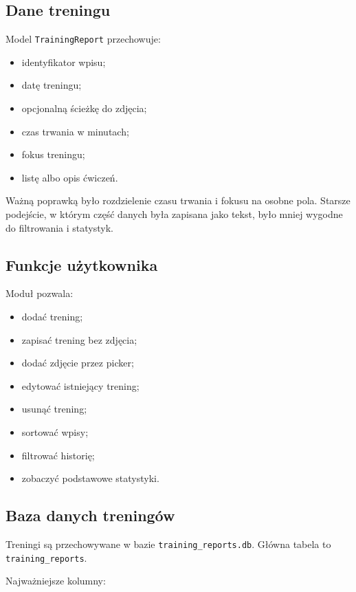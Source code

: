 \documentclass[12pt,a4paper]{article}
\begin{document}
\subsection{Dane treningu}

Model \texttt{TrainingReport} przechowuje:

\begin{itemize}
    \item identyfikator wpisu;
    \item datę treningu;
    \item opcjonalną ścieżkę do zdjęcia;
    \item czas trwania w minutach;
    \item fokus treningu;
    \item listę albo opis ćwiczeń.
\end{itemize}

Ważną poprawką było rozdzielenie czasu trwania i fokusu na osobne pola. Starsze podejście, w którym część danych była zapisana jako tekst, było mniej wygodne do filtrowania i statystyk.

\subsection{Funkcje użytkownika}

Moduł pozwala:

\begin{itemize}
    \item dodać trening;
    \item zapisać trening bez zdjęcia;
    \item dodać zdjęcie przez picker;
    \item edytować istniejący trening;
    \item usunąć trening;
    \item sortować wpisy;
    \item filtrować historię;
    \item zobaczyć podstawowe statystyki.
\end{itemize}

\subsection{Baza danych treningów}

Treningi są przechowywane w bazie \texttt{training\_reports.db}. Główna tabela to \texttt{training\_reports}.

Najważniejsze kolumny:
\end{document}
